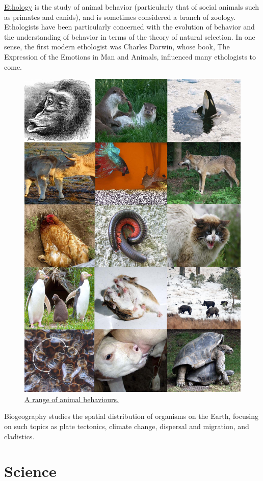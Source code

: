 \href{https://en.wikipedia.org/wiki/Ethology}{Ethology} is the study of animal behavior (particularly that of social animals such as primates and canids), and is sometimes considered a branch of zoology. Ethologists have been particularly concerned with the evolution of behavior and the understanding of behavior in terms of the theory of natural selection. In one sense, the first modern ethologist was Charles Darwin, whose book, The Expression of the Emotions in Man and Animals, influenced many ethologists to come.



\begin{figure}

{\centering \includegraphics[width=0.7\linewidth]{./figures/life/Ethology_diversity_2} 

}

\caption{\href{https://commons.wikimedia.org/wiki/File:Ethology_diversity_2.jpg}{A range of animal behaviours.}}\label{fig:ethology}
\end{figure}

Biogeography studies the spatial distribution of organisms on the Earth, focusing on such topics as plate tectonics, climate change, dispersal and migration, and cladistics.

\hypertarget{science}{%
\section{Science}\label{science}}

